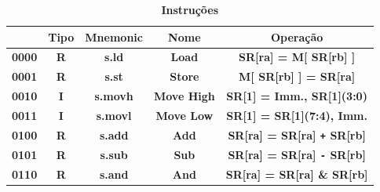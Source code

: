 \documentclass{article}
\begin{document}
    \begin{table}[H]
      \centering
      \captionsetup{labelformat=empty, skip=0pt}
      \caption{\textbf{Instruções}}
      \noindent\hspace*{-2.85cm}
      \begin{tabular}{|c|*{4}{c|}}
        \hline
        \rowcolor{gray!50}
        \multicolumn{1}{|c|}{\textbf{Opcode}} & \multicolumn{1}{|c|}{\textbf{Tipo}} & \multicolumn{1}{|c|}{\textbf{Mnemonic}} & \multicolumn{1}{|c|}{\textbf{Nome}}                   & \multicolumn{1}{|c|}{\textbf{Operação}}                                 \\ \hline
        \multicolumn{1}{|c|}{\textbf{0000}}   & \multicolumn{1}{c|}{\textbf{R}}     & \multicolumn{1}{c|}{\textbf{s.ld}}      & \multicolumn{1}{c|}{\textbf{Load}}                    & \multicolumn{1}{c|}{\textbf{SR[ra] = M[ SR[rb] ]}}                      \\ \hline
        \multicolumn{1}{|c|}{\textbf{0001}}   & \multicolumn{1}{c|}{\textbf{R}}     & \multicolumn{1}{c|}{\textbf{s.st}}      & \multicolumn{1}{c|}{\textbf{Store}}                   & \multicolumn{1}{c|}{\textbf{M[ SR[rb] ] = SR[ra]}}                      \\ \hline
        \multicolumn{1}{|c|}{\textbf{0010}}   & \multicolumn{1}{c|}{\textbf{I}}     & \multicolumn{1}{c|}{\textbf{s.movh}}    & \multicolumn{1}{c|}{\textbf{Move High}}               & \multicolumn{1}{c|}{\textbf{SR[1] = {Imm., SR[1](3:0)}}}                \\ \hline
        \multicolumn{1}{|c|}{\textbf{0011}}   & \multicolumn{1}{c|}{\textbf{I}}     & \multicolumn{1}{c|}{\textbf{s.movl}}    & \multicolumn{1}{c|}{\textbf{Move Low}}                & \multicolumn{1}{c|}{\textbf{SR[1] = {SR[1](7:4), Imm.}}}                \\ \hline
        \multicolumn{1}{|c|}{\textbf{0100}}   & \multicolumn{1}{c|}{\textbf{R}}     & \multicolumn{1}{c|}{\textbf{s.add}}     & \multicolumn{1}{c|}{\textbf{Add}}                     & \multicolumn{1}{c|}{\textbf{SR[ra] = SR[ra] \texttt{+} SR[rb]}}         \\ \hline
        \multicolumn{1}{|c|}{\textbf{0101}}   & \multicolumn{1}{c|}{\textbf{R}}     & \multicolumn{1}{c|}{\textbf{s.sub}}     & \multicolumn{1}{c|}{\textbf{Sub}}                     & \multicolumn{1}{c|}{\textbf{SR[ra] = SR[ra] \texttt{-} SR[rb]}}         \\ \hline
        \multicolumn{1}{|c|}{\textbf{0110}}   & \multicolumn{1}{c|}{\textbf{R}}     & \multicolumn{1}{c|}{\textbf{s.and}}     & \multicolumn{1}{c|}{\textbf{And}}                     & \multicolumn{1}{c|}{\textbf{SR[ra] = SR[ra] \& SR[rb]}}                 \\ \hline

\end{tabular}
\end{table}
\end{document}
